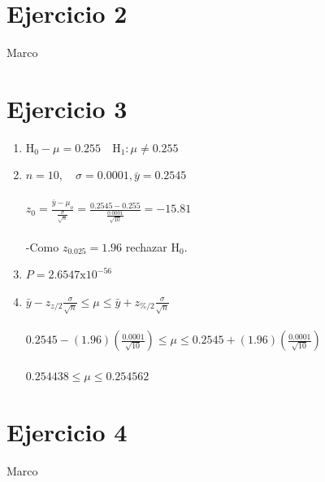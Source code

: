 \documentclass[12pt,a4paper,table]{article}
\begin{document}
\section*{Ejercicio 2}
Marco

\section*{Ejercicio 3}
\begin{enumerate}[label=(\alph*)]
    \item
    		$\mathrm{H}_{0}-\mu=0.255 \quad \mathrm{H}_{1}: \mu \neq 0.255$
    \item
    		$n=10, \quad \sigma=0.0001, \bar{y}=0.2545$ \\\\
$z_{0}=\frac{\bar{y}-\mu_{o}}{\frac{\sigma}{\sqrt{n}}}=\frac{0.2545-0.255}{\frac{0.0001}{\sqrt{10}}}=-15.81$\\\\
-Como $z_{0.025} = 1.96$ rechazar $\mathrm{H}_{0}$.
	\item
		$P=2.6547 \mathrm{x} 10^{-56}$
	\item
		$\bar{y}-z_{z / 2} \frac{\sigma}{\sqrt{n}} \leq \mu \leq \bar{y}+z_{\% / 2} \frac{\sigma}{\sqrt{n}}$\\\\
$0.2545-(1.96)\left(\frac{0.0001}{\sqrt{10}}\right) \leq \mu \leq 0.2545+(1.96)\left(\frac{0.0001}{\sqrt{10}}\right)$\\\\
$0.254438 \leq \mu \leq 0.254562$
\end{enumerate}

\section*{Ejercicio 4}
Marco
\end{document}
